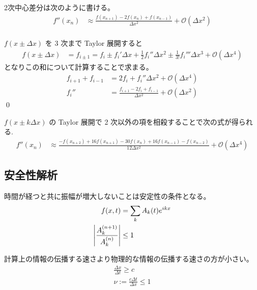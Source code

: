 \documentclass[uplatex,dvipdfmx,a4paper,11pt]{jlreq}
\makeatletter
\theoremstyle{definition}
\renewenvironment{proof}[1][\proofname]{\par
  \normalfont
  \topsep6\p@\@plus6\p@ \trivlist
  \item[\hskip\labelsep{\bfseries #1}\@addpunct{\bfseries}]\ignorespaces\quad\par
}{%
  \qed\endtrivlist\@endpefalse
}
\renewcommand\proofname{証明}
\makeatother
\begin{document}
\begin{theorem}
  2次中心差分は次のように書ける。
  \begin{align}
    f''(x_n) & \approx \frac{f(x_{n+1}) - 2f(x_n) + f(x_{n-1})}{\Delta x^2} + \mathcal{O}(\Delta x^2) \\
  \end{align}
\end{theorem}
\begin{proof}
  $f(x \pm \Delta x)$ を 3 次まで Taylor 展開すると
  \begin{align}
    f(x \pm \Delta x) & = f_{i \pm 1} = f_i \pm f_i'\Delta x + \frac{1}{2}f_i''\Delta x^2 \pm \frac{1}{3!}f_i'''\Delta x^3 + \mathcal{O}(\Delta x^4)
  \end{align}
  となりこの和について計算することで求まる。
  \begin{align}
    f_{i + 1} + f_{i - 1} & = 2f_i + f_i''\Delta x^2 + \mathcal{O}(\Delta x^4)                          \\
    f_i''                 & = \frac{f_{i + 1} - 2f_i + f_{i - 1}}{\Delta x^2} + \mathcal{O}(\Delta x^2)
  \end{align}
\end{proof}

\begin{theorem}[2階微分の差分公式]
  $f(x\pm k\Delta x)$ の Taylor 展開で 2 次以外の項を相殺することで次の式が得られる.
  \begin{align}
    f''(x_n) & \approx \frac{-f(x_{n+2}) + 16f(x_{n+1}) - 30f(x_n) + 16f(x_{n-1}) - f(x_{n-2})}{12\Delta x^2} + \mathcal{O}(\Delta x^4)
  \end{align}
\end{theorem}

\subsection{安全性解析}
\begin{definition}
  時間が経つと共に振幅が増大しないことは安定性の条件となる。
  \begin{align}
    f(x, t)                             & = \sum_kA_k(t)e^{ikx} \\
    \qty|\frac{A_k^{(n+1)}}{A_k^{(n)}}| & \leq 1
  \end{align}
\end{definition}

\begin{definition}
  計算上の情報の伝播する速さより物理的な情報の伝播する速さの方が小さい。
  \begin{align}
    \frac{\Delta x}{\Delta t} \geq c \\
    \nu := \frac{c\Delta t}{\Delta x} \leq 1
  \end{align}
\end{definition}
\end{document}
